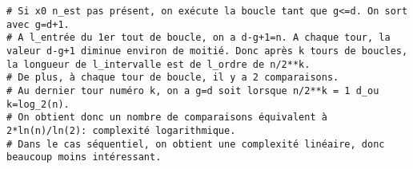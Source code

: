 \begin{lstlisting}
# Si x0 n_est pas présent, on exécute la boucle tant que g<=d. On sort avec g=d+1.
# A l_entrée du 1er tout de boucle, on a d-g+1=n. A chaque tour, la valeur d-g+1 diminue environ de moitié. Donc après k tours de boucles, la longueur de l_intervalle est de l_ordre de n/2**k.
# De plus, à chaque tour de boucle, il y a 2 comparaisons.
# Au dernier tour numéro k, on a g=d soit lorsque n/2**k = 1 d_ou k=log_2(n).
# On obtient donc un nombre de comparaisons équivalent à 2*ln(n)/ln(2): complexité logarithmique.
# Dans le cas séquentiel, on obtient une complexité linéaire, donc beaucoup moins intéressant.
\end{lstlisting}
%
%
%
%
%
%
%
%
%
%
%
%
